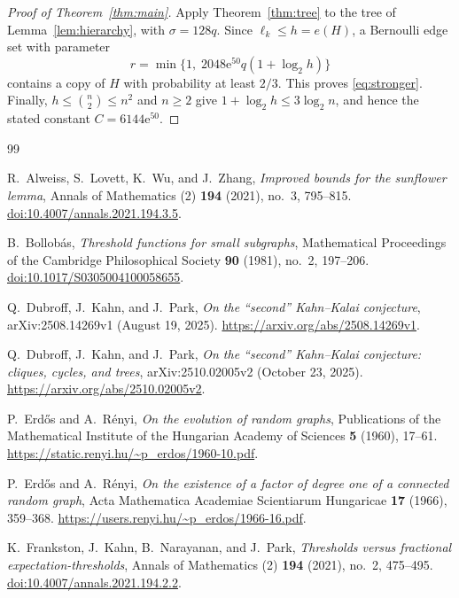 \documentclass[11pt]{article}
\numberwithin{equation}{section}
\newcommand{\ee}{\mathrm e}
\begin{document}
\begin{proof}[Proof of Theorem~\ref{thm:main}]
Apply Theorem~\ref{thm:tree} to the tree of
Lemma~\ref{lem:hierarchy}, with $\sigma=128q$. Since
$\ell_k\le h=e(H)$, a Bernoulli edge set with parameter
\[
 r=\min\{1,\;2048\ee^{50}q(1+\log_2 h)\}
\]
contains a copy of $H$ with probability at least $2/3$. This proves
\eqref{eq:stronger}. Finally, $h\le\binom n2\le n^2$ and $n\ge2$
give $1+\log_2 h\le3\log_2 n$, and hence the stated constant
$C=6144\ee^{50}$.
\end{proof}


\begin{thebibliography}{99}
\raggedright

R.~Alweiss, S.~Lovett, K.~Wu, and J.~Zhang,
\emph{Improved bounds for the sunflower lemma},
Annals of Mathematics (2) \textbf{194} (2021), no.~3, 795--815.
\href{https://doi.org/10.4007/annals.2021.194.3.5}{doi:10.4007/annals.2021.194.3.5}.

B.~Bollob\'as,
\emph{Threshold functions for small subgraphs},
Mathematical Proceedings of the Cambridge Philosophical Society
\textbf{90} (1981), no.~2, 197--206.
\href{https://doi.org/10.1017/S0305004100058655}{doi:10.1017/S0305004100058655}.

Q.~Dubroff, J.~Kahn, and J.~Park,
\emph{On the ``second'' Kahn--Kalai conjecture},
arXiv:2508.14269v1 (August 19, 2025).
\url{https://arxiv.org/abs/2508.14269v1}.

Q.~Dubroff, J.~Kahn, and J.~Park,
\emph{On the ``second'' Kahn--Kalai conjecture: cliques, cycles, and trees},
arXiv:2510.02005v2 (October 23, 2025).
\url{https://arxiv.org/abs/2510.02005v2}.

P.~Erd\H{o}s and A.~R\'enyi,
\emph{On the evolution of random graphs},
Publications of the Mathematical Institute of the Hungarian Academy of
Sciences \textbf{5} (1960), 17--61.
\url{https://static.renyi.hu/~p_erdos/1960-10.pdf}.

P.~Erd\H{o}s and A.~R\'enyi,
\emph{On the existence of a factor of degree one of a connected random graph},
Acta Mathematica Academiae Scientiarum Hungaricae
\textbf{17} (1966), 359--368.
\url{https://users.renyi.hu/~p_erdos/1966-16.pdf}.

K.~Frankston, J.~Kahn, B.~Narayanan, and J.~Park,
\emph{Thresholds versus fractional expectation-thresholds},
Annals of Mathematics (2) \textbf{194} (2021), no.~2, 475--495.
\href{https://doi.org/10.4007/annals.2021.194.2.2}{doi:10.4007/annals.2021.194.2.2}.


\end{thebibliography}
\end{document}
